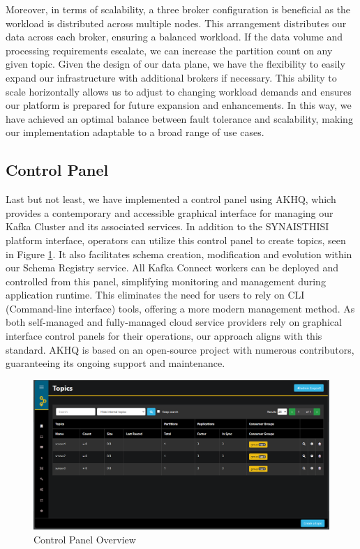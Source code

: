 Moreover, in terms of scalability, a three broker configuration is beneficial as the workload is distributed across multiple nodes. This arrangement distributes our data across each broker, ensuring a balanced workload. If the data volume and processing requirements escalate, we can increase the partition count on any given topic. Given the design of our data plane, we have the flexibility to easily expand our infrastructure with additional brokers if necessary. This ability to scale horizontally allows us to adjust to changing workload demands and ensures our platform is prepared for future expansion and enhancements. In this way, we have achieved an optimal balance between fault tolerance and scalability, making our implementation adaptable to a broad range of use cases.

\subsection{Control Panel}
Last but not least, we have implemented a control panel using AKHQ, which provides a contemporary and accessible graphical interface for managing our Kafka Cluster and its associated services. In addition to the SYNAISTHISI platform interface, operators can utilize this control panel to create topics, seen in Figure \ref{ControlPanel}. It also facilitates schema creation, modification and evolution within our Schema Registry service. All Kafka Connect workers can be deployed and controlled from this panel, simplifying monitoring and management during application runtime. This eliminates the need for users to rely on CLI (Command-line interface) tools, offering a more modern management method. As both self-managed and fully-managed cloud service providers rely on graphical interface control panels for their operations, our approach aligns with this standard. AKHQ is based on an open-source project with numerous contributors, guaranteeing its ongoing support and maintenance.

\begin{figure}
    \centering
    \includegraphics[width=1\linewidth]{Screenshot 2024-01-25 141106.png}
    \caption{Control Panel Overview}
    \label{ControlPanel}
\end{figure}


